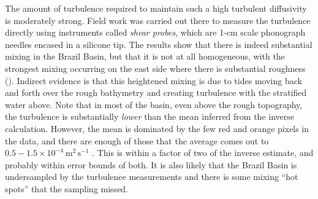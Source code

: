 The amount of turbulence required to maintain such a high turbulent diffusivity is moderately strong.  Field work was carried out there to measure the turbulence directly using instruments called \emph{shear probes}, which are 1-cm scale phonograph needles encased in a silicone tip.  The results show that there is indeed substantial mixing in the Brazil Basin, but that it is not at all homogeneous, with the strongest mixing occurring on the east side where there is substantial roughness ().  Indirect evidence is that this heightened mixing is due to tides moving back and forth over the rough bathymetry and creating turbulence with the stratified water above.  Note that in most of the basin, even above the rough topography, the turbulence is substantially \emph{lower} than the mean inferred from the inverse calculation.  However, the mean is dominated by the few red and orange pixels in the data, and there are enough of those that the average comes out to $0.5-1.5\times10^{-4}\ \mathrm{m^2\,s^{-1}}$ \citep{polzinetal97}.  This is within a factor of two of the inverse estimate, and probably within error bounds of both.  It is also likely that the Brazil Basin is undersampled by the turbulence measurements and there is some mixing ``hot spots'' that the sampling missed.   

